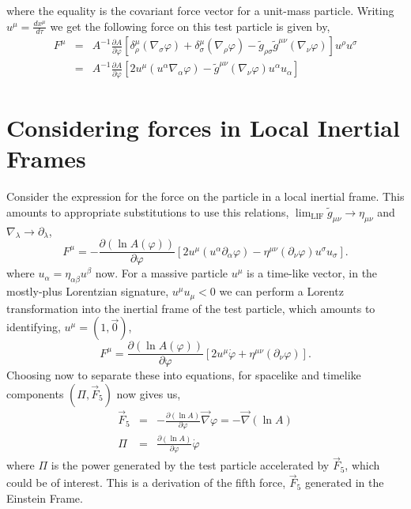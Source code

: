 where the equality is the covariant force vector for a unit-mass particle. Writing $u^{\mu} = \frac{dx^{\mu}}{d\tau}$ we get the following force on this test particle is given by,
\begin{eqnarray}
    F^{\mu} &=& A^{-1}\frac{\partial A}{\partial\varphi}\left[\delta^{\mu}_{\rho}(\nabla_{\sigma}\varphi) + \delta^{\mu}_{\sigma}(\nabla_{\rho}\varphi) - \tilde{g}_{\rho\sigma}\tilde{g}^{\mu\nu}(\nabla_{\nu}\varphi)\right]u^{\rho}u^{\sigma} \\
    &=& A^{-1}\frac{\partial A}{\partial\varphi}\left[2u^{\mu}(u^{\alpha}\nabla_{\alpha}\varphi) - \tilde{g}^{\mu\nu}(\nabla_{\nu}\varphi)u^{\alpha}u_{\alpha}\right]
\end{eqnarray}
\section{Considering forces in Local Inertial Frames}
Consider the expression for the force on the particle in a local inertial frame. This amounts to appropriate substitutions to use this relations, $\lim_{\text{LIF}}\tilde{g}_{\mu\nu} \rightarrow \eta_{\mu\nu}$ and $\nabla_{\lambda}\rightarrow\partial_{\lambda}$,
\begin{equation}
    F^{\mu} =  -\frac{\partial (\ln A(\varphi))}{\partial\varphi}\left[2u^{\mu}(u^{\alpha}\partial_{\alpha}\varphi) - \eta^{\mu\nu}(\partial_{\nu}\varphi)u^{\sigma}u_{\sigma}\right].
\end{equation}
where $u_{\alpha}= \eta_{\alpha\beta}u^{\beta}$ now. For a massive particle $u^{\mu}$ is a time-like vector, in the mostly-plus Lorentzian signature, $u^{\mu}u_{\mu} < 0$ we can perform a Lorentz transformation into the inertial frame of the test particle, which amounts to identifying, $u^{\mu} = (1, \vec{0})$, 
\begin{equation}
    F^{\mu} = \frac{\partial (\ln A(\varphi))}{\partial\varphi}\left[2u^{\mu}\dot{\varphi}+ \eta^{\mu\nu}(\partial_{\nu}\varphi)\right].
\end{equation}
Choosing now to separate these into equations, for spacelike and timelike components $(\Pi, \vec{F}_5)$ now gives us,
\begin{eqnarray}
    \vec{F}_5 &=& -\frac{\partial (\ln A)}{\partial \varphi}\vec{\nabla}\varphi =-\vec{\nabla}\left(\ln A\right)\\
    \Pi &=& \frac{\partial (\ln A)}{\partial \varphi}\dot{\varphi}
\end{eqnarray}
where $\Pi$ is the power generated by the test particle accelerated by $\vec{F}_5$, which could be of interest. This is a derivation of the fifth force, $\vec{F}_5$ generated in the Einstein Frame.   

